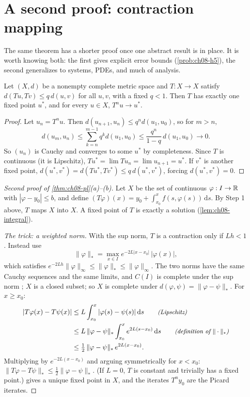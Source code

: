 \section{A second proof: contraction mapping}\label{sec:ch08-contraction}

The same theorem has a shorter proof once one abstract result is in place.
It is worth knowing both: the first gives explicit error bounds
(\cref{prob:ch08-h5}), the second generalizes to systems, PDEs, and much of
analysis.

\begin{theorem}\label{thm:ch08-banach}
Let $(X,d)$ be a nonempty complete metric space and $T:X\to X$ satisfy
$d(Tu,Tv)\le q\,d(u,v)$ for all $u,v$, with a fixed $q<1$. Then $T$ has exactly
one fixed point $u^*$, and for every $u\in X$, $T^nu\to u^*$.
\end{theorem}
\begin{proof}
Let $u_n = T^nu$. Then $d(u_{n+1},u_n)\le q^nd(u_1,u_0)$, so for $m>n$,
\[
  d(u_m,u_n)\le\sum_{k=n}^{m-1}q^kd(u_1,u_0)\le\frac{q^n}{1-q}\,d(u_1,u_0)\to0 .
\]
So $(u_n)$ is Cauchy and converges to some $u^*$ by completeness. Since $T$ is
continuous (it is Lipschitz), $Tu^* = \lim Tu_n = \lim u_{n+1} = u^*$. If $v^*$
is another fixed point, $d(u^*,v^*) = d(Tu^*,Tv^*)\le q\,d(u^*,v^*)$, forcing
$d(u^*,v^*) = 0$.
\end{proof}

\begin{proof}[Second proof of \cref{thm:ch08-pl}(a)--(b)]
Let $X$ be the set of continuous $\varphi:I\to\mathbb{R}$ with $|\varphi - y_0|\le b$,
and define $(T\varphi)(x) = y_0 + \int_{x_0}^xf(s,\varphi(s))\,\mathrm{d}s$. By
Step 1 above, $T$ maps $X$ into $X$. A fixed point of $T$ is exactly a solution
(\cref{lem:ch08-integral}).

\emph{The trick: a weighted norm.} With the sup norm, $T$ is a contraction only
if $Lh<1$. Instead use
\[
  \|\varphi\|_* = \max_{x\in I}e^{-2L|x - x_0|}\,|\varphi(x)| ,
\]
which satisfies $e^{-2Lh}\|\varphi\|_\infty\le\|\varphi\|_*\le\|\varphi\|_\infty$. The
two norms have the same Cauchy sequences and the same limits, and
$C(I)$ is complete under the sup norm \parencite[Ch.~7]{Rudin}; $X$ is a closed
subset; so $X$ is complete under $d(\varphi,\psi) = \|\varphi - \psi\|_*$. For
$x\ge x_0$:
\begin{align*}
  |T\varphi(x) - T\psi(x)|
  &\le L\int_{x_0}^{x}|\varphi(s) - \psi(s)|\,\mathrm{d}s
     \qquad\text{\small\itshape(Lipschitz)}\\
  &\le L\,\|\varphi - \psi\|_*\int_{x_0}^{x}e^{2L(s - x_0)}\,\mathrm{d}s
     \qquad\text{\small\itshape(definition of $\|\cdot\|_*$)}\\
  &\le \tfrac12\,\|\varphi - \psi\|_*\,e^{2L(x - x_0)} .
\end{align*}
Multiplying by $e^{-2L(x - x_0)}$ and arguing symmetrically for $x<x_0$:
$\|T\varphi - T\psi\|_*\le\frac12\|\varphi - \psi\|_*$. (If $L = 0$, $T$ is constant
and trivially has a fixed point.)  gives a unique fixed
point in $X$, and the iterates $T^n y_0$ are the Picard iterates.
\end{proof}

